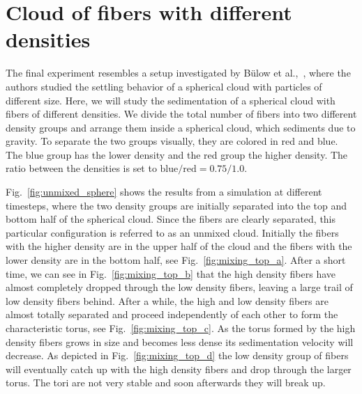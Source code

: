 \section{Cloud of fibers with different densities}
\label{sec:mixed_density_sphere}

The final experiment resembles a setup investigated by Bülow et al.,~\cite{Bulow2015}, where the authors studied the settling behavior of a spherical cloud with particles of different size. Here, we will study the sedimentation of a spherical cloud with fibers of different densities. We divide the total number of fibers into two different density groups and arrange them inside a spherical cloud, which sediments due to gravity. To separate the two groups visually, they are colored in red and blue. The blue group has the lower density and the red group the higher density. The ratio between the densities is set to $\text{blue} / \text{red}= 0.75 / 1.0$.

Fig.~\ref{fig:unmixed_sphere} shows the results from a simulation at different timesteps, where the two density groups are initially separated into the top and bottom half of the spherical cloud. Since the fibers are clearly separated, this particular configuration is referred to as an unmixed cloud. Initially the fibers with the higher density are in the upper half of the cloud and the fibers with the lower density are in the bottom half, see Fig.~\ref{fig:mixing_top_a}. After a short time, we can see in Fig.~\ref{fig:mixing_top_b} that the high density fibers have almost completely dropped through the low density fibers, leaving a large trail of low density fibers behind. After a while, the high and low density fibers are almost totally separated and proceed independently of each other to form the characteristic torus, see Fig.~\ref{fig:mixing_top_c}. As the torus formed by the high density fibers grows in size and becomes less dense its sedimentation velocity will decrease. As depicted in Fig.~\ref{fig:mixing_top_d} the low density group of fibers will eventually catch up with the high density fibers and drop through the larger torus. The tori are not very stable and soon afterwards they will break up.

